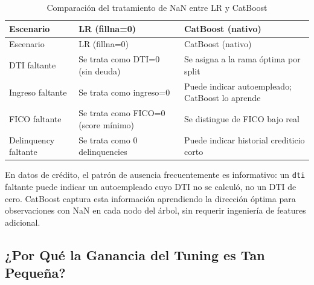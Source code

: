 \documentclass[
  spanish,
  11pt,
  letterpaper,
]{scrbook}
\theoremstyle{plain}
\theoremstyle{remark}
\begin{document}
\begin{longtable}[]{@{}
  >{\raggedright\arraybackslash}p{}
  >{\raggedright\arraybackslash}p{}
  >{\raggedright\arraybackslash}p{}@{}}
\caption{Comparación del tratamiento de NaN entre LR y
CatBoost}\label{tbl-nan-handling}\tabularnewline
\toprule\noalign{}
\begin{minipage}[b]{\linewidth}\raggedright
Escenario
\end{minipage} & \begin{minipage}[b]{\linewidth}\raggedright
LR (fillna=0)
\end{minipage} & \begin{minipage}[b]{\linewidth}\raggedright
CatBoost (nativo)
\end{minipage} \\
\midrule\noalign{}
\endfirsthead
\toprule\noalign{}
\begin{minipage}[b]{\linewidth}\raggedright
Escenario
\end{minipage} & \begin{minipage}[b]{\linewidth}\raggedright
LR (fillna=0)
\end{minipage} & \begin{minipage}[b]{\linewidth}\raggedright
CatBoost (nativo)
\end{minipage} \\
\midrule\noalign{}
\endhead
\bottomrule\noalign{}
\endlastfoot
DTI faltante & Se trata como DTI=0 (sin deuda) & Se asigna a la rama
óptima por split \\
Ingreso faltante & Se trata como ingreso=0 & Puede indicar autoempleado;
CatBoost lo aprende \\
FICO faltante & Se trata como FICO=0 (score mínimo) & Se distingue de
FICO bajo real \\
Delinquency faltante & Se trata como 0 delinquencies & Puede indicar
historial crediticio corto \\
\end{longtable}

En datos de crédito, el patrón de ausencia frecuentemente es
informativo: un \texttt{dti} faltante puede indicar un autoempleado cuyo
DTI no se calculó, no un DTI de cero. CatBoost captura esta información
aprendiendo la dirección óptima para observaciones con NaN en cada nodo
del árbol, sin requerir ingeniería de features adicional.

\subsection{¿Por Qué la Ganancia del Tuning es Tan
Pequeña?}\label{sec-tuning-gain}
\end{document}
